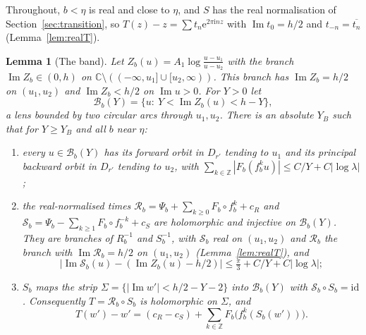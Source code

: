 \documentclass[11pt]{amsart}
\newtheorem{lemma}[theorem]{Lemma}
\theoremstyle{definition}
\newcommand{\Rr}{R}
\newcommand{\eee}{\mathrm{e}}
\newcommand{\ii}{\mathrm{i}}
\begin{document}
Throughout, $b<\eta$ is real and close to $\eta$,
and $S$ has the real normalisation of Section~\ref{sec:transition}, so
$T(z)-z=\sum t_n\eee^{2\pi\ii nz}$ with $\operatorname{Im}t_0=h/2$ and
$t_{-n}=\overline{t_n}$ (Lemma~\ref{lem:realT}).

\begin{lemma}[The band]\label{lem:band}
Let $Z_b(u)=A_1\log\frac{u-u_1}{u-u_2}$ with the branch
$\operatorname{Im}Z_b\in(0,h)$ on $\mathbb C\setminus((-\infty,u_1]\cup[u_2,\infty))$.
This branch has $\operatorname{Im}Z_b=h/2$ on $(u_1,u_2)$ and
$\operatorname{Im}Z_b<h/2$ on $\operatorname{Im}u>0$.  For $Y>0$ let
\[
 \mathcal B_b(Y)=\{u:\ Y<\operatorname{Im}Z_b(u)<h-Y\},
\]
a lens bounded by two circular arcs through $u_1,u_2$.  There is an absolute
$Y_B$ such that for $Y\ge Y_B$ and all $b$ near $\eta$:
\begin{enumerate}
\item[(i)] every $u\in\mathcal B_b(Y)$ has its forward orbit in $D_{r'}$ tending
  to $u_1$ and its principal backward orbit in $D_{r'}$ tending to $u_2$, with
  $\sum_{k\in\mathbb Z}|F_b(f_b^ku)|\le C/Y+C|\log\lambda|$;
\item[(ii)] the real-normalised times $\mathcal R_b=\Psi_b+\sum_{k\ge0}F_b\circ f_b^k+c_R$
  and $\mathcal S_b=\Psi_b-\sum_{k\ge1}F_b\circ f_b^{-k}+c_S$ are holomorphic and
  injective on $\mathcal B_b(Y)$.  They are branches of $\Rr_b^{-1}$ and
  $S_b^{-1}$, with $\mathcal S_b$ real on $(u_1,u_2)$ and $\mathcal R_b$ the
  branch with $\operatorname{Im}\mathcal R_b=h/2$ on $(u_1,u_2)$
  (Lemma~\ref{lem:realT}), and
  \[
   \bigl|\operatorname{Im}\mathcal S_b(u)-(\operatorname{Im}Z_b(u)-h/2)\bigr|
   \le\tfrac\pi3+C/Y+C|\log\lambda| ;
  \]
\item[(iii)] $S_b$ maps the strip $\Sigma=\{|\operatorname{Im}w'|<h/2-Y-2\}$
  into $\mathcal B_b(Y)$ with $\mathcal S_b\circ S_b=\mathrm{id}$.  Consequently
  $T=\mathcal R_b\circ S_b$ is holomorphic on $\Sigma$, and
  \[
   T(w')-w'=(c_R-c_S)+\sum_{k\in\mathbb Z}F_b\bigl(f_b^k(S_b(w'))\bigr).
  \]
\end{enumerate}
\end{lemma}
\end{document}
